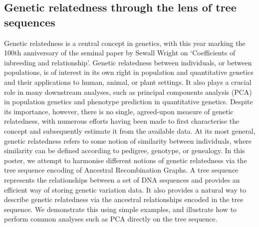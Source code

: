 \subsection*{Genetic relatedness through the lens of tree sequences}

Genetic relatedness is a central concept in genetics, with this year marking the 100th anniversary of the seminal paper by Sewall Wright on `Coefficients of inbreeding and relationship'. 
Genetic relatedness between individuals, or between populations, is of interest in its own right in population and quantitative genetics and their applications to human, animal, or plant settings.
It also plays a crucial role in many downstream analyses, such as principal components analysis (PCA) in population genetics and phenotype prediction in quantitative genetics.
Despite its importance, however, there is no single, agreed-upon measure of genetic relatedness, with numerous efforts having been made to first characterise the concept and subsequently estimate it from the available data.
At its most general, genetic relatedness refers to some notion of similarity between individuals, where similarity can be defined according to pedigree, genotype, or genealogy.
In this poster, we attempt to harmonise different notions of genetic relatedness via the tree sequence encoding of 
Ancestral Recombination Graphs.
A tree sequence represents the relationships between a set of DNA sequences and provides an efficient way of storing genetic variation data.
It also provides a natural way to describe genetic relatedness via the ancestral relationships encoded in the tree sequence.
We demonstrate this using simple examples, and illustrate how to perform common analyses such as PCA directly on the tree sequence.

\clearpage